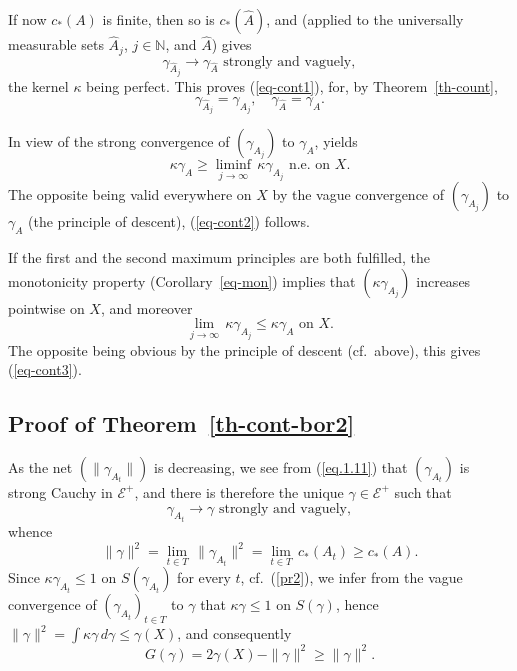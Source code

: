 \documentclass[12pt,a4paper,reqno]{amsart} %
\theoremstyle{lause}
\theoremstyle{maaritelma}
\theoremstyle{lause}
\theoremstyle{maaritelma}
\numberwithin{equation}{section}
\begin{document}
If now $c_*(A)$ is finite, then so is $c_*(\widehat{A})$, and \cite[Theorem~4.2]{F1} (applied to the universally measurable sets $\widehat{A}_j$, $j\in\mathbb N$, and $\widehat{A}$) gives
\[\gamma_{\widehat{A}_j}\to\gamma_{\widehat{A}}\text{ \ strongly and vaguely},\]
the kernel $\kappa$ being perfect. This proves (\ref{eq-cont1}), for, by Theorem~\ref{th-count},
\[\gamma_{\widehat{A}_j}=\gamma_{A_j},\quad\gamma_{\widehat{A}}=\gamma_A.\]

In view of the strong convergence of $(\gamma_{A_j})$ to $\gamma_A$, \cite[Lemma~3.2.4]{F1} yields
\[\kappa\gamma_A\geqslant\liminf_{j\to\infty}\,\kappa\gamma_{A_j}\text{ \ n.e.\ on $X$}.\]
The opposite being valid everywhere on $X$ by the vague convergence of $(\gamma_{A_j})$ to $\gamma_A$ (the principle of descent), (\ref{eq-cont2}) follows.

If the first and the second maximum principles are both fulfilled, the monotonicity property (Corollary~\ref{eq-mon}) implies that $(\kappa\gamma_{A_j})$ increases pointwise on $X$, and moreover \[\lim_{j\to\infty}\,\kappa\gamma_{A_j}\leqslant\kappa\gamma_A\text{ \ on $X$}.\] The opposite being obvious by the principle of descent (cf.\ above), this gives (\ref{eq-cont3}).

\subsection{Proof of Theorem~\ref{th-cont-bor2}}\label{pr-gap} As the net $(\|\gamma_{A_t}\|)$ is decreasing, we see from (\ref{eq.1.11}) that $(\gamma_{A_t})$ is strong Cauchy in $\mathcal E^+$, and there is therefore the unique $\gamma\in\mathcal E^+$ such that
\begin{equation}\label{eqcont}\gamma_{A_t}\to\gamma\text{ \ strongly and vaguely},\end{equation}
whence
\begin{equation}\label{bigcap1}\|\gamma\|^2=\lim_{t\in T}\,\|\gamma_{A_t}\|^2=\lim_{t\in T}\,c_*(A_t)\geqslant c_*(A).\end{equation}
Since $\kappa\gamma_{A_t}\leqslant1$ on $S(\gamma_{A_t})$ for every $t$, cf.\ (\ref{pr2}), we infer from the vague convergence of $(\gamma_{A_t})_{t\in T}$ to $\gamma$ that $\kappa\gamma\leqslant1$ on $S(\gamma)$, hence $\|\gamma\|^2=\int\kappa\gamma\,d\gamma\leqslant\gamma(X)$, and consequently
\begin{equation}\label{bigcap11}G(\gamma)=2\gamma(X)-\|\gamma\|^2\geqslant\|\gamma\|^2.\end{equation}
\end{document}
